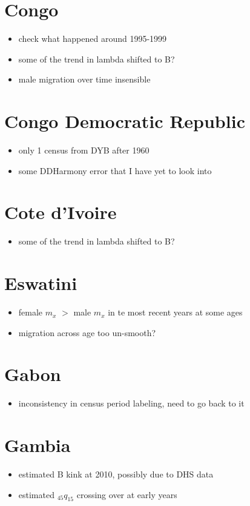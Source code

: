 \documentclass[12pt,a4paper]{article}
\begin{document}
\section*{Congo}
\begin{itemize}
\item check what happened around 1995-1999
\item some of the trend in lambda shifted to B?
\item male migration over time insensible
\end{itemize}

\section*{Congo Democratic Republic}
\begin{itemize}
\item only 1 census from DYB after 1960
\item some DDHarmony error that I have yet to look into
\end{itemize}

\section*{Cote d'Ivoire}
\begin{itemize}
\item some of the trend in lambda shifted to B?
\end{itemize}

\section*{Eswatini}
\begin{itemize}
\item female $m_x$ $>$ male $m_x$ in te most recent years at some ages
\item migration across age too un-smooth?
\end{itemize}

\section*{Gabon}
\begin{itemize}
\item inconsistency in census period labeling, need to go back to it
\end{itemize}

\section*{Gambia}
\begin{itemize}
\item estimated B kink at 2010, possibly due to DHS data
\item estimated $_{45}q_{15}$ crossing over at early years
\end{itemize}
\end{document}
